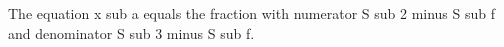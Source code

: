 The equation x sub a equals the fraction with numerator S sub 2 minus S sub f and denominator S sub 3 minus S sub f.